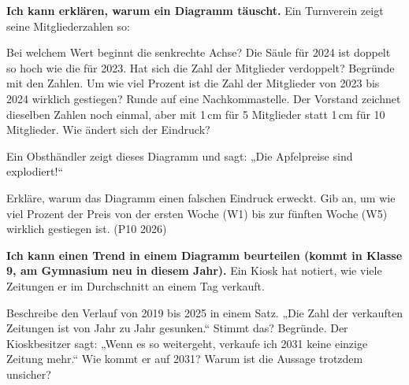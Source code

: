 \begin{aufgabe}{\textbf{Ich kann erklären, warum ein Diagramm täuscht.} Ein Turnverein zeigt seine Mitgliederzahlen so:}


\begin{teile}
\teil Bei welchem Wert beginnt die senkrechte Achse? \leerfeld
\teil Die Säule für 2024 ist doppelt so hoch wie die für 2023. Hat sich die Zahl der Mitglieder verdoppelt? Begründe mit den Zahlen.
\teil Um wie viel Prozent ist die Zahl der Mitglieder von 2023 bis 2024 wirklich gestiegen? Runde auf eine Nachkommastelle. \leerfeld[\%]
\teil Der Vorstand zeichnet dieselben Zahlen noch einmal, aber mit 1\,cm für 5 Mitglieder statt 1\,cm für 10 Mitglieder. Wie ändert sich der Eindruck?
\end{teile}
Ein Obsthändler zeigt dieses Diagramm und sagt: „Die Apfelpreise sind explodiert!“


\begin{teile}
\teil Erkläre, warum das Diagramm einen falschen Eindruck erweckt. Gib an, um wie viel Prozent der Preis von der ersten Woche (W1) bis zur fünften Woche (W5) wirklich gestiegen ist. (P10 2026)
\end{teile}
\end{aufgabe}

\begin{aufgabe}{\textbf{Ich kann einen Trend in einem Diagramm beurteilen (kommt in Klasse 9, am Gymnasium neu in diesem Jahr).} Ein Kiosk hat notiert, wie viele Zeitungen er im Durchschnitt an einem Tag verkauft.}


\begin{teile}
\teil Beschreibe den Verlauf von 2019 bis 2025 in einem Satz.
\teil „Die Zahl der verkauften Zeitungen ist von Jahr zu Jahr gesunken.“ Stimmt das? Begründe.
\teil Der Kioskbesitzer sagt: „Wenn es so weitergeht, verkaufe ich 2031 keine einzige Zeitung mehr.“ Wie kommt er auf 2031? Warum ist die Aussage trotzdem unsicher?
\end{teile}
\end{aufgabe}

